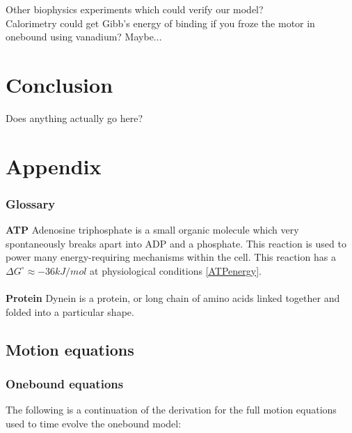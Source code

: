 \documentclass[10pt]{article} %
\begin{document}
Other biophysics experiments which could verify our model?\\

Calorimetry could get Gibb's energy of binding if you froze the motor in onebound using vanadium? Maybe...\\

\section{Conclusion}
Does anything actually go here?




\section{Appendix}

\subsubsection{Glossary}
\textbf{ATP} Adenosine triphosphate is a small organic molecule which very spontaneously breaks apart into ADP and a phosphate. This reaction is used to power many energy-requiring mechanisms within the cell. This reaction has a $\Delta G^\circ \approx -36 kJ/mol$ at physiological conditions \ref{ATPenergy}.\\\\
\textbf{Protein} Dynein is a protein, or long chain of amino acids linked together and folded into a particular shape.\\

\subsection{Motion equations}

\subsubsection{Onebound equations}
\label{sec:ob-motion-equations}
The following is a continuation of the derivation for the full motion equations used to time evolve the onebound model:
\end{document}
